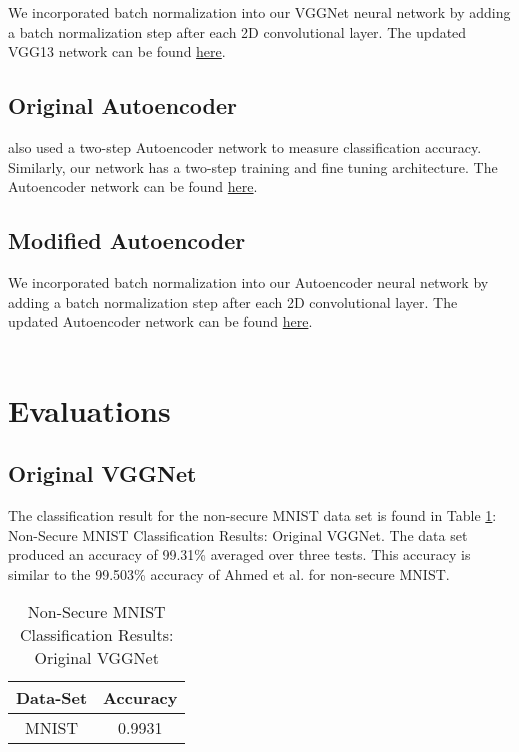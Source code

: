 \documentclass[12pt, titlepage]{article}
\begin{document}
\noindent We incorporated batch normalization into our VGGNet neural network by adding a batch normalization step after each 2D convolutional layer. The updated VGG13 network can be found \href{https://github.com/peter-michalski/CAS771/blob/master/python/VGG/MYupdated_VGG.py}{here}.\\

\subsection{Original Autoencoder} 

\noindent \cite{ahmed2018obfuscated} also used a two-step Autoencoder network to measure classification accuracy. Similarly, our network has a two-step training and fine tuning architecture. The Autoencoder network can be found 
\href{https://github.com/peter-michalski/CAS771/blob/master/python/Autoencoder/MYoriginal_autoencoder.py}{here}.\\

\subsection{Modified Autoencoder} 

We incorporated batch normalization into our Autoencoder neural network by adding a batch normalization step after each 2D convolutional layer. The updated Autoencoder network can be found \href{https://github.com/peter-michalski/CAS771/blob/master/python/Autoencoder/MYupgraded_autoencoder.py}{here}.\\

 
 ~\newpage
\section{Evaluations}\label{Evaluations}
\subsection{Original VGGNet}\label{EvalOrigVGG}

The classification result for the non-secure MNIST data set is found in Table \ref{table:basicVGG_MNIST}: Non-Secure MNIST Classification Results: Original VGGNet. The data set produced an accuracy of 99.31\% averaged over three tests. This accuracy is similar to the 99.503\% accuracy of Ahmed et al. for non-secure MNIST.\\ 

\begin{table}[!h]
	\begin{center}
		\begin{tabular}{| c | c |}
			\hline
			\textbf{Data-Set} & \textbf{Accuracy}\\
			\hline
			MNIST & 0.9931\\
			\hline
		\end{tabular}
		\caption{Non-Secure MNIST Classification Results: Original VGGNet}
		\label{table:basicVGG_MNIST}
	\end{center}
\end{table}
\end{document}
